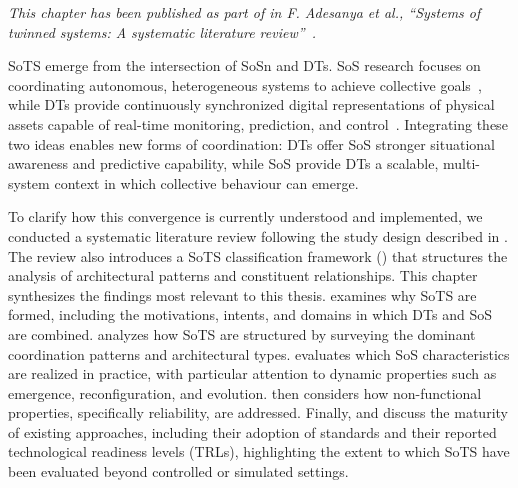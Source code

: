 \begin{center}
\begin{tcolorbox}[colback=gray!5,colframe=gray!40]
\textit{This chapter has been published as part of in F. Adesanya et al., ``Systems of twinned systems: A systematic literature review''~\cite{adesanya2025systems}.}
\end{tcolorbox}
\end{center}

SoTS emerge from the intersection of SoSn and DTs. SoS research focuses on coordinating autonomous, heterogeneous systems to achieve collective goals~\cite{maier1998architecting}, while DTs provide continuously synchronized digital representations of physical assets capable of real-time monitoring, prediction, and control~\cite{kritzinger2018digital, tao2018digital}. Integrating these two ideas enables new forms of coordination: DTs offer SoS stronger situational awareness and predictive capability, while SoS provide DTs a scalable, multi-system context in which collective behaviour can emerge.


To clarify how this convergence is currently understood and implemented, we conducted a systematic literature review following the study design described in . The review also introduces a SoTS classification framework () that structures the analysis of architectural patterns and constituent relationships. This chapter synthesizes the findings most relevant to this thesis. 
 examines why SoTS are formed, including the motivations, intents, and domains in which DTs and SoS are combined.  analyzes how SoTS are structured by surveying the dominant coordination patterns and architectural types.  evaluates which SoS characteristics are realized in practice, with particular attention to dynamic properties such as emergence, reconfiguration, and evolution.  then considers how non-functional properties, specifically reliability, are addressed. Finally,  and  discuss the maturity of existing approaches, including their adoption of standards and their reported technological readiness levels (TRLs), highlighting the extent to which SoTS have been evaluated beyond controlled or simulated settings.
